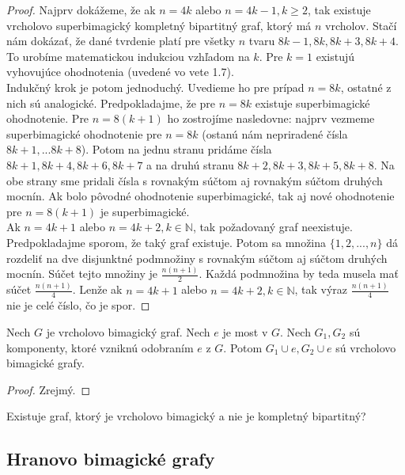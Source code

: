 \begin{proof} Najprv dokážeme, že ak $n = 4k$ alebo $n = 4k-1, k \geq 2$, tak existuje vrcholovo superbimagický kompletný bipartitný graf, ktorý má $n$ vrcholov. Stačí nám dokázať, že dané tvrdenie platí pre všetky $n$ tvaru $8k-1, 8k, 8k+3, 8k+4$. To urobíme matematickou indukciou vzhľadom na $k$. Pre $k = 1$ existujú vyhovujúce ohodnotenia (uvedené vo vete 1.7). \\

Indukčný krok je potom jednoduchý. Uvedieme ho pre prípad $n = 8k$, ostatné z nich sú analogické. Predpokladajme, že pre $n = 8k$ existuje superbimagické ohodnotenie. Pre $n = 8(k+1)$ ho zostrojíme nasledovne: najprv vezmeme superbimagické ohodnotenie pre $n = 8k$ (ostanú nám nepriradené čísla $8k+1, ... 8k+8$). Potom na jednu stranu pridáme čísla $8k+1, 8k+4, 8k+6, 8k+7$ a na druhú stranu $8k+2, 8k+3, 8k+5, 8k+8$. Na obe strany sme pridali čísla s rovnakým súčtom aj rovnakým súčtom druhých mocnín. Ak bolo pôvodné ohodnotenie superbimagické, tak aj nové ohodnotenie pre $n = 8(k+1)$ je superbimagické. \\

Ak $n = 4k+1$ alebo $n = 4k+2, k \in \mathbb{N}$, tak požadovaný graf neexistuje. Predpokladajme sporom, že taký graf existuje. Potom sa množina $\{1, 2, ... , n\}$ dá rozdeliť na dve disjunktné podmnožiny s rovnakým súčtom aj súčtom druhých mocnín. Súčet tejto množiny je $\frac{n(n+1)}{2}$. Každá podmnožina by teda musela mať súčet $\frac{n(n+1)}{4}$. Lenže ak  $n = 4k+1$ alebo $n = 4k+2, k \in \mathbb{N}$, tak výraz $\frac{n(n+1)}{4}$ nie je celé číslo, čo je spor.
\end{proof}

\begin{subtheorem} Nech $G$ je vrcholovo bimagický graf. Nech $e$ je most v $G$. Nech $G_1, G_2$ sú komponenty, ktoré vzniknú odobraním $e$ z $G$. Potom $G_1 \cup e, G_2 \cup e$ sú vrcholovo bimagické grafy. 
\end{subtheorem}

\begin{proof}
Zrejmý.
\end{proof}

\begin{subhypothesis} Existuje graf, ktorý je vrcholovo bimagický a nie je kompletný bipartitný?
\end{subhypothesis}



\subsection{Hranovo bimagické grafy}

